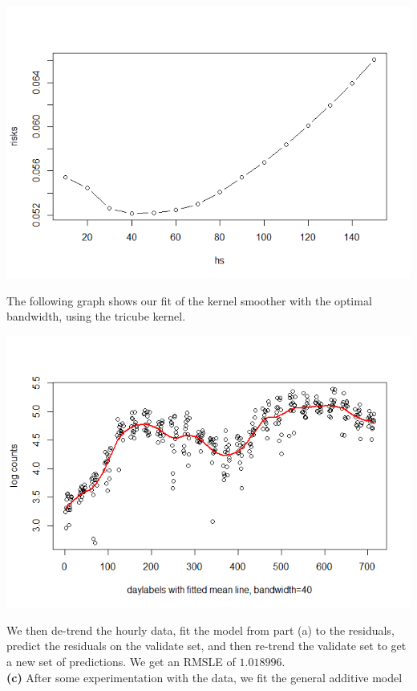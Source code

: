 \documentclass[12pt]{article}
\begin{document}
\includegraphics[scale=0.5]{risks}

The following graph shows our fit of the kernel smoother with the optimal bandwidth, using the tricube kernel.

\includegraphics[scale=0.5]{fitt}



We then de-trend the hourly data, fit the model from part (a) to the residuals, predict the residuals on the validate set, and then re-trend the validate set to get a new set of predictions. We get an RMSLE of $1.018996$.\\

\textbf{(c)} After some experimentation with the data, we fit the general additive model
\end{document}
